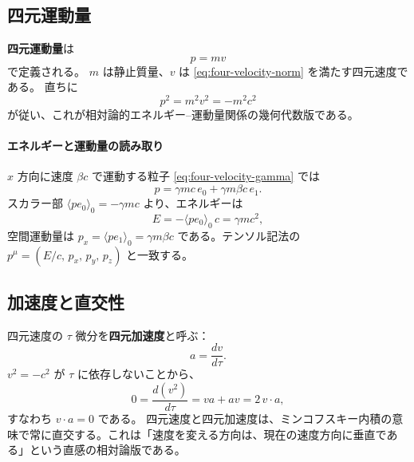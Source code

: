 \documentclass[dvipdfmx,a4paper,oneside]{jsbook}
\numberwithin{equation}{chapter}
\begin{document}
\subsection{四元運動量}

\textbf{四元運動量}は
\begin{equation}
  p = m v
  \label{eq:four-momentum}
\end{equation}
で定義される。
\(m\) は静止質量、\(v\) は \eqref{eq:four-velocity-norm} を満たす四元速度である。
直ちに
\begin{equation}
  p^2 = m^2 v^2 = -m^2 c^2
  \label{eq:four-momentum-norm}
\end{equation}
が従い、これが相対論的エネルギー–運動量関係の幾何代数版である。

\paragraph{エネルギーと運動量の読み取り}
\(x\) 方向に速度 \(\beta c\) で運動する粒子 \eqref{eq:four-velocity-gamma} では
\begin{equation}
  p = \gamma m c\, e_0 + \gamma m \beta c\, e_1.
  \label{eq:momentum-example}
\end{equation}
スカラー部 \(\langle p e_0 \rangle_0 = -\gamma m c\) より、エネルギーは
\begin{equation}
  E = -\langle p e_0 \rangle_0\, c = \gamma m c^2,
  \label{eq:energy-ga}
\end{equation}
空間運動量は \(p_x = \langle p e_1 \rangle_0 = \gamma m \beta c\) である。テンソル記法の \(p^\mu = (E/c,\, p_x,\, p_y,\, p_z)\) と一致する。

\subsection{加速度と直交性}

四元速度の \(\tau\) 微分を\textbf{四元加速度}と呼ぶ：
\begin{equation}
  a = \frac{dv}{d\tau}.
  \label{eq:four-acceleration}
\end{equation}
\(v^2 = -c^2\) が \(\tau\) に依存しないことから、
\begin{equation}
  0 = \frac{d(v^2)}{d\tau} = v a + a v = 2\, v\cdot a,
  \label{eq:velocity-acceleration-ortho}
\end{equation}
すなわち \(v\cdot a = 0\) である。
四元速度と四元加速度は、ミンコフスキー内積の意味で常に直交する。これは「速度を変える方向は、現在の速度方向に垂直である」という直感の相対論版である。
\end{document}
